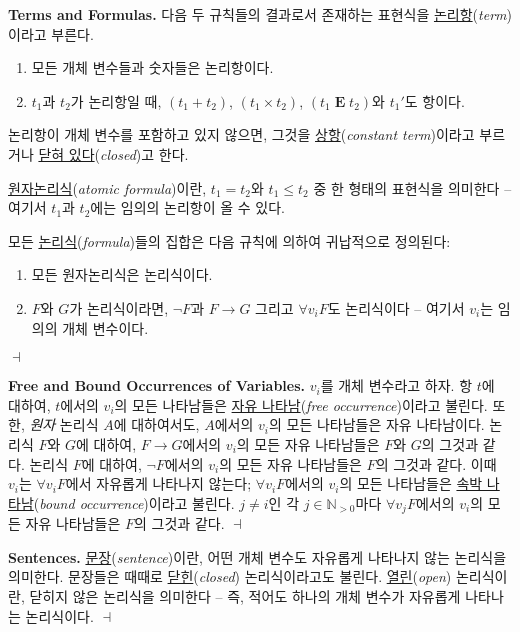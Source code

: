 \documentclass[12pt]{paper}
\newenvironment{context}[1][]
{ \noindent \textbf{{#1}.} }
{ \hfill $ \dashv $ }
\begin{document}
\begin{context}[Terms and Formulas]
다음 두 규칙들의 결과로서 존재하는 표현식을 \underline{논리항}(\textit{term})이라고 부른다.
\begin{enumerate}
\item 모든 개체 변수들과 숫자들은 논리항이다.
\item $t_{1}$과 $t_{2}$가 논리항일 때, $\left( t_{1} + t_{2} \right)$, $\left( t_{1} \times t_{2} \right)$, $\left( t_{1} \mathop{\mathbf{E}} t_{2} \right)$와 $t_{1} '$도 항이다.
\end{enumerate}

논리항이 개체 변수를 포함하고 있지 않으면, 그것을 \underline{상항}(\textit{constant term})이라고 부르거나 \underline{닫혀 있다}(\textit{closed})고 한다.

\underline{원자논리식}(\textit{atomic formula})이란,
$t_{1} = t_{2}$와 $t_{1} \leq t_{2}$ 중 한 형태의 표현식을 의미한다 --
여기서 $t_{1}$과 $t_{2}$에는 임의의 논리항이 올 수 있다.

모든 \underline{논리식}(\textit{formula})들의 집합은 다음 규칙에 의하여 귀납적으로 정의된다:
\begin{enumerate}
\item 모든 원자논리식은 논리식이다.
\item $F$와 $G$가 논리식이라면, $\lnot F$과 $F \rightarrow G$ 그리고 $\forall v_{i} F$도 논리식이다 --
여기서 $v_{i}$는 임의의 개체 변수이다.
\end{enumerate}
\end{context}

\begin{context}[Free and Bound Occurrences of Variables]
$v_{i}$를 개체 변수라고 하자.
항 $t$에 대하여, $t$에서의 $v_{i}$의 모든 나타남들은 \underline{자유 나타남}(\textit{free occurrence})이라고 불린다.
또한, \textit{원자} 논리식 $A$에 대하여서도, $A$에서의 $v_{i}$의 모든 나타남들은 자유 나타남이다.
논리식 $F$와 $G$에 대하여, $F \rightarrow G$에서의 $v_{i}$의 모든 자유 나타남들은 $F$와 $G$의 그것과 같다.
논리식 $F$에 대하여, $\lnot F$에서의 $v_{i}$의 모든 자유 나타남들은 $F$의 그것과 같다.
이때 $v_{i}$는 $\forall v_{i} F$에서 자유롭게 나타나지 않는다;
$\forall v_{i} F$에서의 $v_{i}$의 모든 나타남들은 \underline{속박 나타남}(\textit{bound occurrence})이라고 불린다.
$j \neq i$인 각 $j \in \mathbb{N}_{>0}$마다 $\forall v_{j} F$에서의 $v_{i}$의 모든 자유 나타남들은 $F$의 그것과 같다.
\end{context}

\begin{context}[Sentences]
\underline{문장}(\textit{sentence})이란, 어떤 개체 변수도 자유롭게 나타나지 않는 논리식을 의미한다.
문장들은 때때로 \underline{닫힌}(\textit{closed}) 논리식이라고도 불린다.
\underline{열린}(\textit{open}) 논리식이란, 닫히지 않은 논리식을 의미한다 --
즉, 적어도 하나의 개체 변수가 자유롭게 나타나는 논리식이다.
\end{context}
\end{document}
